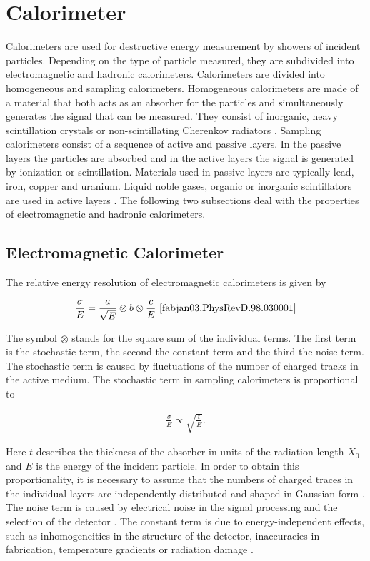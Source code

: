 \documentclass[12pt, a4paper]{thesis}
\begin{document}
\section{Calorimeter}
\label{sec:org937122c}

Calorimeters are used for destructive energy measurement by showers of incident
particles. Depending on the type of particle measured, they are subdivided into
electromagnetic and hadronic calorimeters. Calorimeters are divided into
homogeneous and sampling calorimeters. Homogeneous calorimeters are made of a
material that both acts as an absorber for the particles and simultaneously
generates the signal that can be measured. They consist of inorganic, heavy
scintillation crystals or non-scintillating Cherenkov radiators
\cite{PhysRevD.98.030001}. Sampling calorimeters consist of a sequence of active
and passive layers. In the passive layers the particles are absorbed and in the
active layers the signal is generated by ionization or scintillation. Materials
used in passive layers are typically lead, iron, copper and uranium. Liquid
noble gases, organic or inorganic scintillators are used in active layers
\cite{PhysRevD.98.030001}. The following two subsections deal with the properties
of electromagnetic and hadronic calorimeters.

\subsection{Electromagnetic Calorimeter}
\label{sec:em-calo}

The relative energy resolution of electromagnetic calorimeters is
given by 

\begin{align}
  \frac{\sigma}{E} = \frac{a}{\sqrt{E}} \otimes b \otimes \frac{c}{E}\ \cite{fabjan03,PhysRevD.98.030001}
\end{align}

The symbol \(\otimes\) stands for the square sum of the individual terms. The
first term is the stochastic term, the second the constant term and the third
the noise term.  The stochastic term is caused by fluctuations of the number of
charged tracks in the active medium. The stochastic term in sampling
calorimeters is proportional to

\begin{align}
  \frac{\sigma}{E}\propto \sqrt{\frac{t}{E}}.
\end{align}

Here \(t\) describes the thickness of the absorber in units of the
radiation length \(X_0\) and \(E\) is the energy of the incident
particle. In order to obtain this proportionality, it is necessary to
assume that the numbers of charged traces in the individual layers are
independently distributed and shaped in Gaussian form \cite{amaldi81}. The
noise term is caused by electrical noise in the signal processing and
the selection of the detector \cite{fabjan03}. The constant term is due to
energy-independent effects, such as inhomogeneities in the structure
of the detector, inaccuracies in fabrication, temperature gradients or
radiation damage \cite{fabjan03}.
\end{document}

